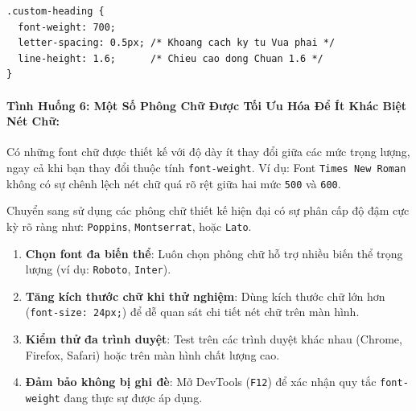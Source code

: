 \documentclass[11pt,oneside]{book}
\newcommand{\codeinline}[1]{\textcolor{accentOrange}{\texttt{#1}}}
\begin{document}
\begin{codeWindow}
\begin{lstlisting}[language=CSS3]
.custom-heading {
  font-weight: 700;
  letter-spacing: 0.5px; /* Khoang cach ky tu Vua phai */
  line-height: 1.6;      /* Chieu cao dong Chuan 1.6 */
}
\end{lstlisting}
\end{codeWindow}

\paragraph{Tình Huống 6: Một Số Phông Chữ Được Tối Ưu Hóa Để Ít Khác Biệt Nét Chữ:}

\begin{warnBox}
Có những font chữ được thiết kế với độ dày ít thay đổi giữa các mức trọng lượng, ngay cả khi bạn thay đổi thuộc tính \codeinline{font-weight}. Ví dụ: Font \codeinline{Times New Roman} không có sự chênh lệch nét chữ quá rõ rệt giữa hai mức \codeinline{500} và \codeinline{600}.
\end{warnBox}

\begin{tipBox}
Chuyển sang sử dụng các phông chữ thiết kế hiện đại có sự phân cấp độ đậm cực kỳ rõ ràng như: \codeinline{Poppins}, \codeinline{Montserrat}, hoặc \codeinline{Lato}.
\end{tipBox}

\begin{tipBox}
\begin{enumerate}[leftmargin=1.5em, itemsep=3pt, parsep=0pt]
    \item \textbf{Chọn font đa biến thể}: Luôn chọn phông chữ hỗ trợ nhiều biến thể trọng lượng (ví dụ: \codeinline{Roboto}, \codeinline{Inter}).
    \item \textbf{Tăng kích thước chữ khi thử nghiệm}: Dùng kích thước chữ lớn hơn (\codeinline{font-size: 24px;}) để dễ quan sát chi tiết nét chữ trên màn hình.
    \item \textbf{Kiểm thử đa trình duyệt}: Test trên các trình duyệt khác nhau (Chrome, Firefox, Safari) hoặc trên màn hình chất lượng cao.
    \item \textbf{Đảm bảo không bị ghi đè}: Mở DevTools (\codeinline{F12}) để xác nhận quy tắc \codeinline{font-weight} đang thực sự được áp dụng.
\end{enumerate}
\end{tipBox}
\end{document}
